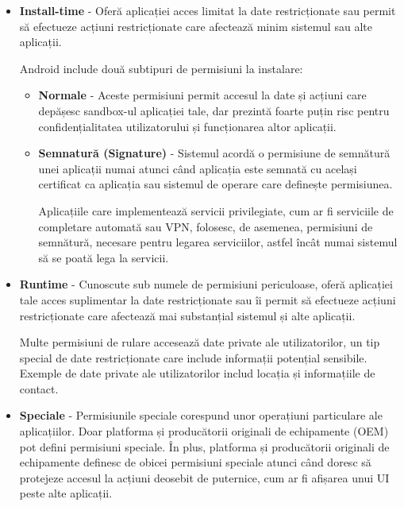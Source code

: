 \documentclass[12pt,a4paper]{report}
\begin{document}
\begin{itemize}
    \item \textbf{Install-time} - Oferă aplicației acces limitat la date restricționate sau permit să efectueze acțiuni restricționate care afectează minim sistemul sau alte aplicații.\cite{android-permissions} 
    
    Android include două subtipuri de permisiuni la instalare:
    \begin{itemize}
        \item \textbf{Normale} - Aceste permisiuni permit accesul la date și acțiuni care depășesc sandbox-ul aplicației tale, 
        dar prezintă foarte puțin risc pentru confidențialitatea utilizatorului și funcționarea altor aplicații.\cite{android-permissions}
        \item \textbf{Semnatură (Signature)} - Sistemul acordă o permisiune de semnătură unei aplicații numai atunci când 
        aplicația este semnată cu același certificat ca aplicația sau sistemul de operare care definește permisiunea.\cite{android-permissions}
        
        Aplicațiile care implementează servicii privilegiate, cum ar fi serviciile de completare automată sau VPN, folosesc, de asemenea, permisiuni de semnătură, 
        necesare pentru legarea serviciilor, astfel încât numai sistemul să se poată lega la servicii.\cite{android-permissions}
    \end{itemize}
    \item \textbf{Runtime} - Cunoscute sub numele de permisiuni periculoase, 
    oferă aplicației tale acces suplimentar la date restricționate sau îi permit să efectueze acțiuni restricționate 
    care afectează mai substanțial sistemul și alte aplicații.\cite{android-permissions}

    Multe permisiuni de rulare accesează date private ale utilizatorilor, un tip special de date restricționate care include informații potențial sensibile. 
    Exemple de date private ale utilizatorilor includ locația și informațiile de contact.\cite{android-permissions}

    \item \textbf{Speciale} - Permisiunile speciale corespund unor operațiuni particulare ale aplicațiilor.
    Doar platforma și producătorii originali de echipamente (OEM) pot defini permisiuni speciale. 
    În plus, platforma și producătorii originali de echipamente definesc de obicei permisiuni speciale 
    atunci când doresc să protejeze accesul la acțiuni deosebit de puternice, cum ar fi afișarea unui UI peste alte aplicații.\cite{android-permissions}
\end{itemize}
\end{document}
